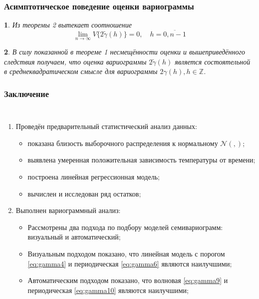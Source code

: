 \documentclass[notheorems]{beamer}
\newtheorem{corollary}{\translate{Corollary}}
\theoremstyle{definition}
\theoremstyle{example}
\theoremstyle{plain}
\newenvironment{Corollary}{\begin{corollary}}{\end{corollary}}
\newcommand{\inp}[1]{}
\newcommand{\descriptive}[2]{\inp{#1/descriptive/#2}}
\newcommand{\normaldistr}{$\mathcal{N}(\descriptive{original}{mean}, \descriptive{original}{variance})$}
\begin{document}
\begin{frame}
  \frametitle{Асимптотическое поведение оценки вариограммы}
  \begin{Corollary}
    Из теоремы 2 вытекает соотношение
    \begin{equation*}
      \lim_{n \to \infty} V\{ 2 \tilde{\gamma}(h) \} = 0, \quad h = \overline{0, n - 1}
    \end{equation*}
  \end{Corollary}

  \begin{Corollary}
    В силу показанной в теореме 1 несмещённости оценки и вышеприведённого следствия получаем, что оценка вариограммы $ 2\tilde{\gamma}(h) $ является состоятельной в среднеквадратическом смысле для вариограммы $ 2\gamma(h), h \in \mathbb{Z} $.
  \end{Corollary}
\end{frame}

\begin{frame}
  \frametitle{Заключение}
  \setlength{\itemindent}{-.5in}
  \begin{columns}
  \vspace{-9pt}
  \begin{enumerate}
    \item Проведён предварительный статистический анализ данных:
      \begin{itemize}
        \item показана близость выборочного распределения к нормальному \normaldistr ;
        \item выявлена умеренная положительная зависимость температуры от времени;
        \item построена линейная регрессионная модель;
        \item вычислен и исследован ряд остатков;
      \end{itemize}
    \item Выполнен вариограммный анализ:
      \begin{itemize}
        \item Рассмотрены два подхода по подбору моделей семивариограмм: \small{визуальный и автоматический};
        \item Визуальным подходом показано, что линейная модель с порогом \eqref{eq:gamma4} и периодическая \eqref{eq:gamma6} являются наилучшими;
        \item Автоматическим подходом показано, что волновая \eqref{eq:gamma9} и периодическая \eqref{eq:gamma10} являются наилучшими;
      \end{itemize}
  \end{enumerate}
  \end{columns}
\end{frame}
\end{document}
